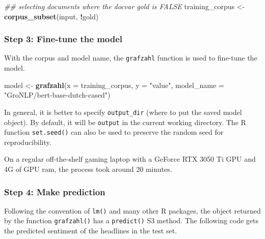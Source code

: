 \documentclass[
  english,
  man,floatsintext]{apa7}
\newenvironment{Shaded}{\begin{snugshade}}{\end{snugshade}}
\newcommand{\CommentTok}[1]{\textcolor[rgb]{0.56,0.35,0.01}{\textit{#1}}}
\newcommand{\DataTypeTok}[1]{\textcolor[rgb]{0.13,0.29,0.53}{#1}}
\newcommand{\KeywordTok}[1]{\textcolor[rgb]{0.13,0.29,0.53}{\textbf{#1}}}
\newcommand{\NormalTok}[1]{#1}
\newcommand{\OperatorTok}[1]{\textcolor[rgb]{0.81,0.36,0.00}{\textbf{#1}}}
\newcommand{\StringTok}[1]{\textcolor[rgb]{0.31,0.60,0.02}{#1}}
\begin{document}
\begin{Shaded}
\begin{Highlighting}[]
\CommentTok{\#\# selecting documents where the docvar \textasciigrave{}gold\textasciigrave{} is FALSE}
\NormalTok{training\_corpus \textless{}{-}}\StringTok{ }\KeywordTok{corpus\_subset}\NormalTok{(input, }\OperatorTok{!}\NormalTok{gold)}
\end{Highlighting}
\end{Shaded}

\hypertarget{step-3-fine-tune-the-model}{%
\subsubsection{Step 3: Fine-tune the model}\label{step-3-fine-tune-the-model}}

With the corpus and model name, the \texttt{grafzahl} function is used to fine-tune the model.

\begin{Shaded}
\begin{Highlighting}[]
\NormalTok{model \textless{}{-}}\StringTok{ }\KeywordTok{grafzahl}\NormalTok{(}\DataTypeTok{x =}\NormalTok{ training\_corpus,}
                  \DataTypeTok{y =} \StringTok{"value"}\NormalTok{,}
                  \DataTypeTok{model\_name =} \StringTok{"GroNLP/bert{-}base{-}dutch{-}cased"}\NormalTok{)}
\end{Highlighting}
\end{Shaded}

In general, it is better to specify \texttt{output\_dir} (where to put the saved model object). By default, it will be \texttt{output} in the current working directory. The R function \texttt{set.seed()} can also be used to preserve the random seed for reproducibility.

On a regular off-the-shelf gaming laptop with a GeForce RTX 3050 Ti GPU and 4G of GPU ram, the process took around 20 minutes.

\hypertarget{step-4-make-prediction}{%
\subsubsection{Step 4: Make prediction}\label{step-4-make-prediction}}

Following the convention of \texttt{lm()} and many other R packages, the object returned by the function \texttt{grafzahl()} has a \texttt{predict()} S3 method. The following code gets the predicted sentiment of the headlines in the test set.
\end{document}
